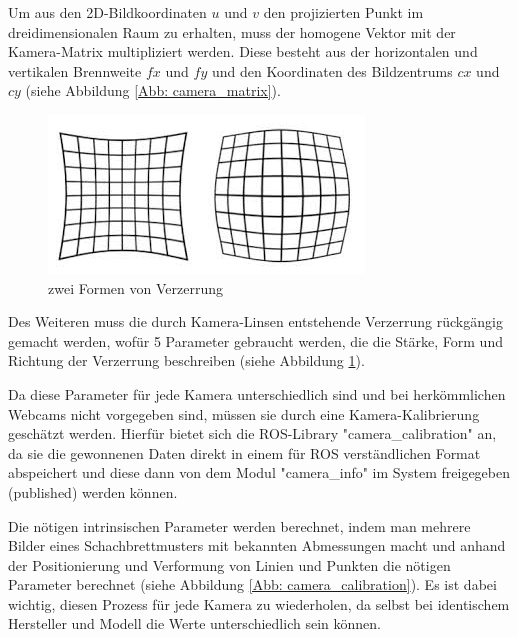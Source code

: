 \documentclass[12pt, ngerman]{article}
\begin{document}
Um aus den 2D-Bildkoordinaten $u$ und $v$ den projizierten Punkt im dreidimensionalen Raum zu erhalten, muss der homogene Vektor mit der Kamera-Matrix multipliziert werden. Diese besteht aus der horizontalen und vertikalen Brennweite $fx$ und $fy$ und den Koordinaten des Bildzentrums $cx$ und $cy$ (siehe Abbildung \ref{Abb: camera_matrix}).

\begin{figure}
  \includegraphics[width=\linewidth]{distortion.jpeg}
  \caption{zwei Formen von Verzerrung}
  \label{Abb: distortion}
\end{figure}
Des Weiteren muss die durch Kamera-Linsen entstehende Verzerrung rückgängig gemacht werden, wofür 5 Parameter gebraucht werden, die die Stärke, Form und Richtung der Verzerrung beschreiben (siehe Abbildung \ref{Abb: distortion}).

Da diese Parameter für jede Kamera unterschiedlich sind und bei herkömmlichen Webcams nicht vorgegeben sind, müssen sie durch eine Kamera-Kalibrierung geschätzt werden. Hierfür bietet sich die ROS-Library "camera\_calibration" an, da sie die gewonnenen Daten direkt in einem für ROS verständlichen Format abspeichert und diese dann von dem Modul "camera\_info" im System freigegeben (published) werden können.

Die nötigen intrinsischen Parameter werden berechnet, indem man mehrere Bilder eines Schachbrettmusters mit bekannten Abmessungen macht und anhand der Positionierung und Verformung von Linien und Punkten die nötigen Parameter berechnet (siehe Abbildung \ref{Abb: camera_calibration}). Es ist dabei wichtig, diesen Prozess für jede Kamera zu wiederholen, da selbst bei identischem Hersteller und Modell die Werte unterschiedlich sein können.
\end{document}
